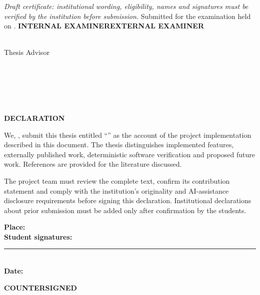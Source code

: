 \noindent\textit{Draft certificate: institutional wording, eligibility, names and signatures must be verified by the institution before submission.}
\vfill
\noindent Submitted for the examination held on \ExamDate.
\vfill
\noindent\textbf{INTERNAL EXAMINER}\hfill\textbf{EXTERNAL EXAMINER}
\vfill
\begin{center}\textbf{\GuideName}\\Thesis Advisor\\\DepartmentName\\\UniversityName\\\CampusName\end{center}
\clearpage
\begin{center}
\DepartmentName\\
{\Large\bfseries\MakeUppercase{\UniversityName}}\\
\CampusName\\[1.7cm]
{\Large\bfseries DECLARATION}
\end{center}
\vspace{0.7cm}
\begin{flushleft}We, \TeamNames, submit this thesis entitled \enquote{\ProjectTitle} as the account of the project implementation described in this document. The thesis distinguishes implemented features, externally published work, deterministic software verification and proposed future work. References are provided for the literature discussed.
\end{flushleft}

\noindent The project team must review the complete text, confirm its contribution statement and comply with the institution's originality and AI-assistance disclosure requirements before signing this declaration. Institutional declarations about prior submission must be added only after confirmation by the students.
\par\vspace{1cm}
\noindent\textbf{Place:} \PlaceName\\[0.4cm]\textbf{Student signatures:} \rule{5cm}{0.4pt}\\[0.4cm]
\textbf{Date:} \ExamDate
\vfill
\begin{center}\textbf{COUNTERSIGNED}\\[1.0cm]\textbf{\DeanName}\\\DepartmentName\\\UniversityName\end{center}
